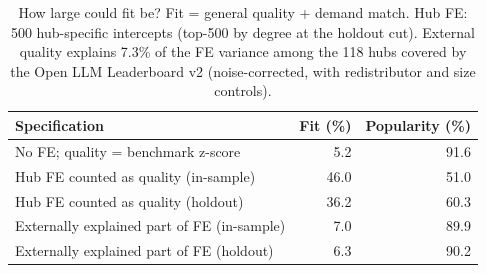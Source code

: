 \begin{table}[t]
\centering
\caption{How large could fit be? Fit = general quality + demand match. Hub FE: 500 hub-specific intercepts (top-500 by degree at the holdout cut). External quality explains 7.3\% of the FE variance among the 118 hubs covered by the Open LLM Leaderboard v2 (noise-corrected, with redistributor and size controls).}
\label{tab:bounds}
\small
\begin{tabular}{lrr}
\toprule
Specification & Fit (\%) & Popularity (\%) \\
\midrule
No FE; quality = benchmark z-score & 5.2 & 91.6 \\
Hub FE counted as quality (in-sample) & 46.0 & 51.0 \\
Hub FE counted as quality (holdout) & 36.2 & 60.3 \\
Externally explained part of FE (in-sample) & 7.0 & 89.9 \\
Externally explained part of FE (holdout) & 6.3 & 90.2 \\
\bottomrule
\end{tabular}
\end{table}
